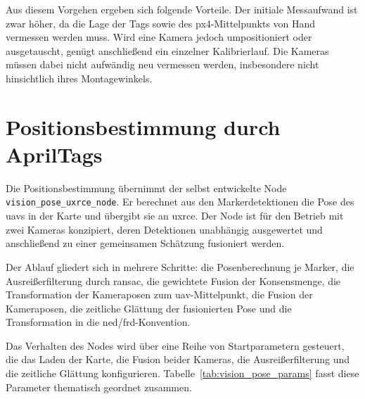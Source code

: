 Aus diesem Vorgehen ergeben sich folgende Vorteile.
Der initiale Messaufwand ist zwar höher, da die Lage der Tags sowie des \gls{px4}-Mittelpunkts von Hand vermessen werden muss.
Wird eine Kamera jedoch umpositioniert oder ausgetauscht, genügt anschließend ein einzelner Kalibrierlauf.
Die Kameras müssen dabei nicht aufwändig neu vermessen werden, insbesondere nicht hinsichtlich ihres Montagewinkels.


\section{Positionsbestimmung durch AprilTags}
\label{sec:pos_positionsbestimmung}
Die Positionsbestimmung übernimmt der selbst entwickelte Node \texttt{vision\_pose\_uxrce\_node}.
Er berechnet aus den Markerdetektionen die Pose des \gls{uav}s in der Karte und übergibt sie an \gls{uxrce}.
Der Node ist für den Betrieb mit zwei Kameras konzipiert, deren Detektionen unabhängig ausgewertet und anschließend zu einer
gemeinsamen Schätzung fusioniert werden.

Der Ablauf gliedert sich in mehrere Schritte: die Posenberechnung je Marker, die Ausreißerfilterung durch \gls{ransac}, die gewichtete Fusion der Konsensmenge, 
die Transformation der Kameraposen zum \gls{uav}-Mittelpunkt, die Fusion der Kameraposen, die zeitliche Glättung der fusionierten Pose 
und die Transformation in die \gls{ned}/\gls{frd}-Konvention.

Das Verhalten des Nodes wird über eine Reihe von Startparametern gesteuert, die das Laden der Karte, die Fusion beider Kameras,
die Ausreißerfilterung und die zeitliche Glättung konfigurieren.
Tabelle~\ref{tab:vision_pose_params} fasst diese Parameter thematisch geordnet zusammen.

